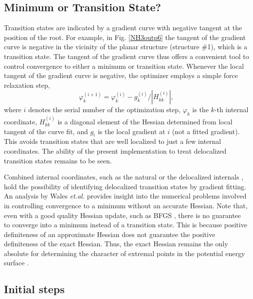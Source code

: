 \documentclass[prl,aps,preprint,showpacs,superbib]{revtex4}
\begin{document}
\subsection{Minimum or Transition State?}

Transition states are indicated by a gradient curve with  negative tangent at the position
of the root.  For example, in Fig. \ref{NH3outp6} the tangent of the gradient curve is negative 
in the vicinity of the planar structure (structure \#1), which is a transition state. The tangent 
of the gradient curve thus offers a convenient tool to control convergence to either a minimum 
or transition state.  Whenever the local tangent of the gradient curve is negative, the optimizer 
employs a simple force relaxation step,
\begin{equation}
\label{tseq}
\varphi_{k}^{(i+1)} = \varphi_{k}^{(i)} -g_{k}^{(i)}/|H_{kk}^{(i)}| ,
\end{equation}
where $i$ denotes the serial number of the optimization step,  $\varphi_{k}$ is the $k$-th internal coordinate,
 $H^{(i)}_{kk}$ is a diagonal element of the Hessian determined from local tangent of the curve fit, and
$g_i$ is the local gradient at $i$ (not a fitted gradient).
This avoids transition states that are well localized to just a few internal coordinates.
The ability of the present implementation to treat delocalized transition states
remains to be seen. 

Combined internal coordinates, such as the natural \cite{Pulay_natural_internals} or the
delocalized internals \cite{Baker_deloc_1}, hold the possibility of identifying delocalized transition 
states by gradient fitting.  An analysis by  Wales {\it et.al.} \cite{Wales_saddlepoint} provides 
insight into the numerical problems involved in controlling convergence to a minimum without an 
accurate Hessian.  Note that, even with a good quality Hessian update, such as BFGS \cite{RFletcher},
there is no guarantee to converge into a minimum instead of a transition state. 
This is because positive definiteness of an approximate Hessian does not guarantee
the positive definiteness of the exact Hessian.  Thus, the exact Hessian remains the only 
absolute for determining the character of extremal points in the potential energy 
surface \cite{Pulay_natural_internals}.

\subsection{Initial steps}
\end{document}
